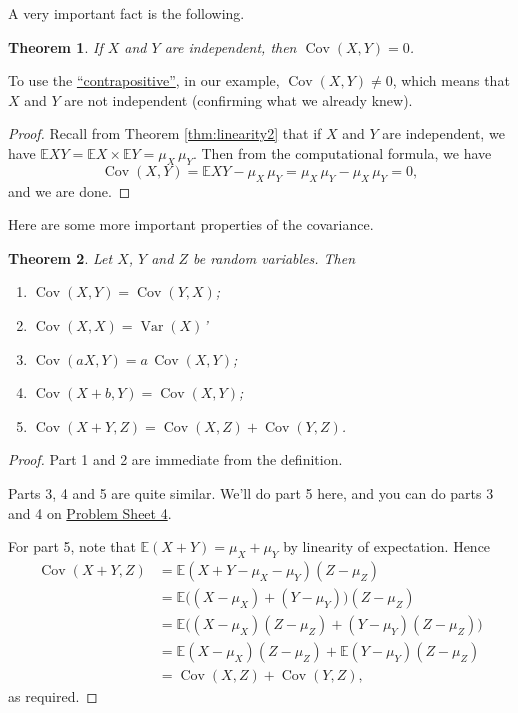 \documentclass[
  a4paper,
]{book}
\providecommand{\tightlist}{%
  \setlength{\itemsep}{0pt}\setlength{\parskip}{0pt}}
\newtheorem{theorem}{Theorem}[chapter]
\theoremstyle{definition}
\theoremstyle{definition}
\theoremstyle{definition}
\theoremstyle{definition}
\theoremstyle{remark}
\begin{document}
A very important fact is the following.

\begin{theorem}
If \(X\) and \(Y\) are independent, then \(\operatorname{Cov}(X,Y) = 0\).
\end{theorem}

To use the \href{https://www.varsitytutors.com/hotmath/hotmath_help/topics/converse-inverse-contrapositive}{``contrapositive''}, in our example, \(\operatorname{Cov}(X,Y) \neq 0\), which means that \(X\) and \(Y\) are not independent (confirming what we already knew).

\begin{proof}
Recall from Theorem \ref{thm:linearity2} that if \(X\) and \(Y\) are independent, we have \(\mathbb EXY = \mathbb EX \times \mathbb EY = \mu_X \, \mu_Y\). Then from the computational formula, we have
\[ \operatorname{Cov}(X,Y) = \mathbb EXY - \mu_X\,\mu_Y = \mu_X\,\mu_Y - \mu_X\,\mu_Y = 0, \]
and we are done.
\end{proof}

Here are some more important properties of the covariance.

\begin{theorem}

Let \(X\), \(Y\) and \(Z\) be random variables. Then

\begin{enumerate}
\def\labelenumi{\arabic{enumi}.}
\tightlist
\item
  \(\operatorname{Cov}(X,Y) = \operatorname{Cov}(Y,X)\);
\item
  \(\operatorname{Cov}(X,X) = \operatorname{Var}(X)\)'
\item
  \(\operatorname{Cov}(aX, Y) = a\,\operatorname{Cov}(X,Y)\);
\item
  \(\operatorname{Cov}(X + b, Y) = \operatorname{Cov}(X,Y)\);
\item
  \(\operatorname{Cov}(X + Y, Z) = \operatorname{Cov}(X, Z) + \operatorname{Cov}(Y,Z)\).
\end{enumerate}

\end{theorem}

\begin{proof}
Part 1 and 2 are immediate from the definition.

Parts 3, 4 and 5 are quite similar. We'll do part 5 here, and you can do parts 3 and 4 on \protect\hyperlink{P4}{Problem Sheet 4}.

For part 5, note that \(\mathbb E(X + Y) = \mu_X + \mu_Y\) by linearity of expectation. Hence
\begin{align*}
\operatorname{Cov}(X + Y, Z)
  &= \mathbb E (X + Y - \mu_X - \mu_Y)(Z - \mu_Z) \\
  &= \mathbb E \big((X - \mu_X) + (Y - \mu_Y)\big)(Z - \mu_Z) \\
  &= \mathbb E \big((X - \mu_X)(Z - \mu_Z) + (Y - \mu_Y) (Z - \mu_Z) \big) \\
  &= \mathbb E (X - \mu_X)(Z - \mu_Z) + \mathbb E  (Y - \mu_Y) (Z - \mu_Z) \\
  &= \operatorname{Cov}(X,Z) + \operatorname{Cov}(Y,Z) ,
\end{align*}
as required.
\end{proof}
\end{document}
